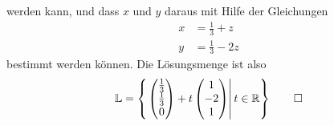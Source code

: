 \begin{loesung}
werden kann, und dass $x$ und $y$ daraus mit Hilfe der Gleichungen
\begin{align*}
x&=\frac13+z\\
y&=\frac13-2z
\end{align*}
bestimmt werden können.
Die Lösungsmenge ist also
\[
\mathbb L =\left\{\left.
\begin{pmatrix}\frac13\\\frac13\\0\end{pmatrix}
+
t\begin{pmatrix}1\\-2\\1\end{pmatrix}
\right| t\in\mathbb R
\right\}
\qedhere
\]
\end{loesung}

